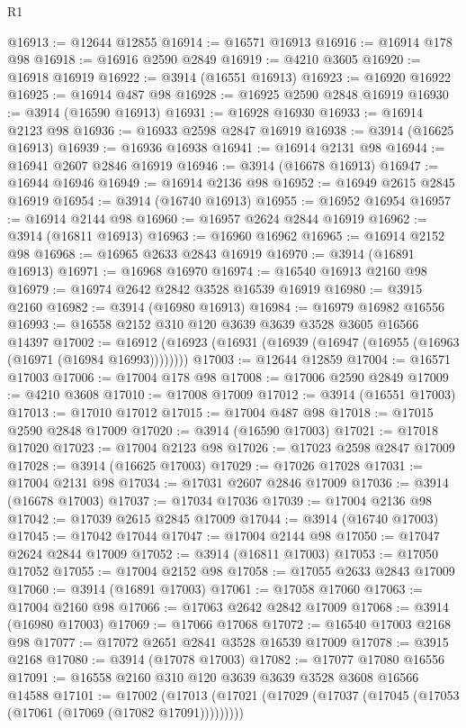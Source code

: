 \begin{lexlean}{R1}
\begin{coremodule}
@16913 := @12644 @12855
@16914 := @16571 @16913
@16916 := @16914 @178 @98
@16918 := @16916 @2590 @2849
@16919 := @4210 @3605
@16920 := @16918 @16919
@16922 := @3914 (@16551 @16913)
@16923 := @16920 @16922
@16925 := @16914 @487 @98
@16928 := @16925 @2590 @2848 @16919
@16930 := @3914 (@16590 @16913)
@16931 := @16928 @16930
@16933 := @16914 @2123 @98
@16936 := @16933 @2598 @2847 @16919
@16938 := @3914 (@16625 @16913)
@16939 := @16936 @16938
@16941 := @16914 @2131 @98
@16944 := @16941 @2607 @2846 @16919
@16946 := @3914 (@16678 @16913)
@16947 := @16944 @16946
@16949 := @16914 @2136 @98
@16952 := @16949 @2615 @2845 @16919
@16954 := @3914 (@16740 @16913)
@16955 := @16952 @16954
@16957 := @16914 @2144 @98
@16960 := @16957 @2624 @2844 @16919
@16962 := @3914 (@16811 @16913)
@16963 := @16960 @16962
@16965 := @16914 @2152 @98
@16968 := @16965 @2633 @2843 @16919
@16970 := @3914 (@16891 @16913)
@16971 := @16968 @16970
@16974 := @16540 @16913 @2160 @98
@16979 := @16974 @2642 @2842 @3528 @16539 @16919
@16980 := @3915 @2160
@16982 := @3914 (@16980 @16913)
@16984 := @16979 @16982 @16556
@16993 := @16558 @2152 @310 @120 @3639 @3639 @3528 @3605 @16566 @14397
@17002 := @16912 (@16923 (@16931 (@16939 (@16947 (@16955 (@16963 (@16971 (@16984 @16993))))))))
@17003 := @12644 @12859
@17004 := @16571 @17003
@17006 := @17004 @178 @98
@17008 := @17006 @2590 @2849
@17009 := @4210 @3608
@17010 := @17008 @17009
@17012 := @3914 (@16551 @17003)
@17013 := @17010 @17012
@17015 := @17004 @487 @98
@17018 := @17015 @2590 @2848 @17009
@17020 := @3914 (@16590 @17003)
@17021 := @17018 @17020
@17023 := @17004 @2123 @98
@17026 := @17023 @2598 @2847 @17009
@17028 := @3914 (@16625 @17003)
@17029 := @17026 @17028
@17031 := @17004 @2131 @98
@17034 := @17031 @2607 @2846 @17009
@17036 := @3914 (@16678 @17003)
@17037 := @17034 @17036
@17039 := @17004 @2136 @98
@17042 := @17039 @2615 @2845 @17009
@17044 := @3914 (@16740 @17003)
@17045 := @17042 @17044
@17047 := @17004 @2144 @98
@17050 := @17047 @2624 @2844 @17009
@17052 := @3914 (@16811 @17003)
@17053 := @17050 @17052
@17055 := @17004 @2152 @98
@17058 := @17055 @2633 @2843 @17009
@17060 := @3914 (@16891 @17003)
@17061 := @17058 @17060
@17063 := @17004 @2160 @98
@17066 := @17063 @2642 @2842 @17009
@17068 := @3914 (@16980 @17003)
@17069 := @17066 @17068
@17072 := @16540 @17003 @2168 @98
@17077 := @17072 @2651 @2841 @3528 @16539 @17009
@17078 := @3915 @2168
@17080 := @3914 (@17078 @17003)
@17082 := @17077 @17080 @16556
@17091 := @16558 @2160 @310 @120 @3639 @3639 @3528 @3608 @16566 @14588
@17101 := @17002
    (@17013 (@17021 (@17029 (@17037 (@17045 (@17053 (@17061 (@17069 (@17082 @17091)))))))))

\end{coremodule}
\end{lexlean}
